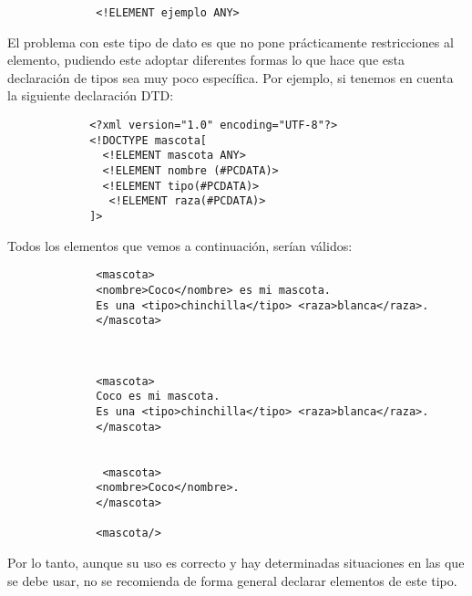 \begin{itemize}
\begin{figure}[H]
\begin{tcolorbox}[sharp corners, colback=yellow!30, colframe=white!20]
\begin{verbatim}
        <!ELEMENT ejemplo ANY>
            \end{verbatim}
        \end{tcolorbox}
    \end{figure}

    El problema con este tipo de dato es que no pone prácticamente restricciones al elemento, pudiendo este adoptar diferentes formas lo que hace que esta declaración de tipos sea muy poco específica. Por ejemplo, si tenemos en cuenta la siguiente declaración DTD:

    \begin{figure}[H]
        \begin{tcolorbox}[sharp corners, colback=yellow!30, colframe=white!20]
            \scriptsize
            \begin{verbatim}
       <?xml version="1.0" encoding="UTF-8"?>
       <!DOCTYPE mascota[
         <!ELEMENT mascota ANY>
         <!ELEMENT nombre (#PCDATA)>
         <!ELEMENT tipo(#PCDATA)>
          <!ELEMENT raza(#PCDATA)>
       ]>
            \end{verbatim}
        \end{tcolorbox}
    \end{figure}

    Todos los elementos que vemos a continuación, serían válidos:


        \begin{figure}[H]
        \begin{tcolorbox}[sharp corners, colback=yellow!30, colframe=white!20]
            \scriptsize
            \begin{verbatim}
        <mascota>
        <nombre>Coco</nombre> es mi mascota.
        Es una <tipo>chinchilla</tipo> <raza>blanca</raza>.
        </mascota>



        <mascota>
        Coco es mi mascota.
        Es una <tipo>chinchilla</tipo> <raza>blanca</raza>.
        </mascota>


         <mascota>
        <nombre>Coco</nombre>.
        </mascota>

        <mascota/>
            \end{verbatim}
        \end{tcolorbox}
    \end{figure}

    Por lo tanto, aunque su uso es correcto y hay determinadas situaciones en las que se debe usar, no se recomienda de forma general declarar elementos de este tipo.
\end{itemize}

